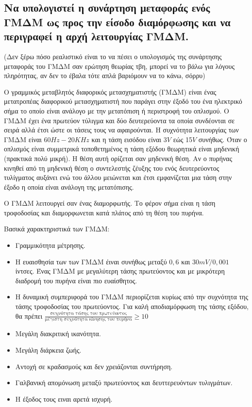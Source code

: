 \documentclass{article}
\begin{document}
\subsection{Να υπολογιστεί η συνάρτηση μεταφοράς ενός ΓΜΔΜ ως προς την είσοδο διαμόρφωσης και να περιγραφεί η αρχή λειτουργίας ΓΜΔΜ.}
(Δεν ξέρω πόσο ρεαλιστικό είναι το να πέσει ο υπολογισμός της συνάρτησης μεταφοράς του ΓΜΔΜ σαν ερώτηση θεωρίας τβη, μπορεί να το βάλω για λόγους πληρότητας, αν δεν το έβαλα τότε
απλά βαριόμουν να το κάνω, σόρρυ)

Ο γραμμικός μεταβλητός διαφορικός μετασχηματιστής (ΓΜΔΜ) είναι ένας μετατροπέας διαφορικού μετασχηματιστή που παράγει στην έξοδό του ένα ηλεκτρικό σήμα το οποίο είναι ανάλογο με την 
μετατόπιση ή περιστροφή του οπλισμού. Ο ΓΜΔΜ έχει ένα πρωτεύον τύλιγμα και δύο δευτερεύοντα τα οποία συνδέονται σε σειρά αλλά έτσι ώστε οι τάσεις τους να αφαιρούνται. Η συχνότητα 
λειτουργίας των ΓΜΔΜ είναι $60Hz-20KHz$ και η τάση εισόδου είναι 3$V$ εώς 15$V$ συνήθως. Όταν ο οπλισμός είναι συμμετρικά τοποθετημένος η τάση εξόδου θεωρητικά είναι μηδενική (πρακτικά
πολύ μικρή). Η θέση αυτή ορίζεται σαν μηδενική θέση. Αν ο πυρήνας κινηθεί από τη μηδενική θέση ο συντελεστής ζέυξης του ενός δευτερεύοντος τυλίγματος αυξάνει ενώ του άλλου 
μειώνεται και έτσι εμφανίζεται μια τάση στην έξοδο η οποία είναι ανάλογη της μετατόπισης.

O ΓΜΔΜ λειτουργεί σαν ένας διαμορφωτής. Το φέρον σήμα είναι η τάση τροφοδοσίας και διαμορφωνεται κατά πλάτος από τη θέση του πυρήνα. 

Βασικά χαρακτηριστικά των ΓΜΔΜ: 

\begin{itemize}
    \item Γραμμικότητα μέτρησης.
    \item Η ευαισθησία των των ΓΜΔΜ έιναι συνήθως μεταξύ $0,6$ και $30mV/0,001$ ίντσες. Ένας ΓΜΔΜ με μεγαλύτερη τάσης πρωτεύοντος και με μικρότερη διαδρομή του πυρήνα είναι πιο ευαίσθητος.
    \item Η δυναμική συμπεριφορά του ΓΜΔΜ περιορίζεται κυρίως από την συχνότητα της τάσης τροφοδοσίας του πρωτεύοντος. Για καλή αποδιαμόρφωση της τάσης εξόδου, θα πρέπει
        \newline$\frac{\text{συχνότητα τάσης του πρωτεύοντος}}{\text{μέγιστη συχνότητα κίνησης του πυρήνα}}\geq 10$
    \item Μεγάλη διακριτική ικανότητα.
    \item Μεγάλη διάρκεια ζωής.
    \item Αντοχή σε κραδασμούς και δεν χρειάζονται συντήρηση.
    \item Γαλβανική απομόνωση μεταξύ πρωτεύοντος και δευττερευόντων τυλιγμάτων.
    \item Η έξοδος τους ειναι αρετά ισχυρή.
\end{itemize}
\end{document}
